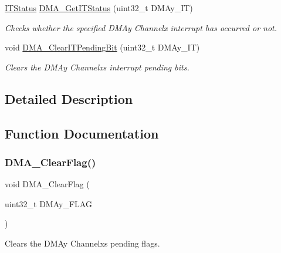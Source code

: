 \begin{DoxyCompactItemize}
\hyperlink{group___exported__types_gaacbd7ed539db0aacd973a0f6eca34074}{I\+T\+Status} \hyperlink{group___d_m_a___exported___functions_ga9287331247150fe84d03ecd7ad8adb52}{D\+M\+A\+\_\+\+Get\+I\+T\+Status} (uint32\+\_\+t D\+M\+Ay\+\_\+\+IT)
\begin{DoxyCompactList}\small\item\em Checks whether the specified D\+M\+Ay Channelx interrupt has occurred or not. \end{DoxyCompactList}\item 
void \hyperlink{group___d_m_a___exported___functions_ga91a7340e5b334a942f3eb1e05ed5f67a}{D\+M\+A\+\_\+\+Clear\+I\+T\+Pending\+Bit} (uint32\+\_\+t D\+M\+Ay\+\_\+\+IT)
\begin{DoxyCompactList}\small\item\em Clears the D\+M\+Ay Channelx\textquotesingle{}s interrupt pending bits. \end{DoxyCompactList}\end{DoxyCompactItemize}


\subsection{Detailed Description}


\subsection{Function Documentation}
\mbox{\label{group___d_m_a___exported___functions_ga25cdca360f309c8ceb7c206cd9ad9119}} 
\subsubsection{\texorpdfstring{D\+M\+A\+\_\+\+Clear\+Flag()}{DMA\_ClearFlag()}}
{\footnotesize\ttfamily void D\+M\+A\+\_\+\+Clear\+Flag (\begin{DoxyParamCaption}\item[{uint32\+\_\+t}]{D\+M\+Ay\+\_\+\+F\+L\+AG }\end{DoxyParamCaption})}



Clears the D\+M\+Ay Channelx\textquotesingle{}s pending flags. 


